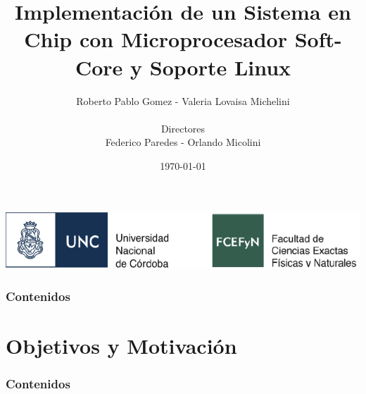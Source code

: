 \documentclass[xcolor=dvipsnames,mathserif,9pt]{beamer}
\author[M. L. Ferster]{Roberto Pablo Gomez - Valeria Lovaisa Michelini \\ \ \\  Directores \\ Federico Paredes - Orlando Micolini}
\title[\hspace{2cm}\insertframenumber/\inserttotalframenumber]{\large
  Implementación de un Sistema en Chip con Microprocesador
Soft-Core y Soporte Linux\\
}
\date{\today} %
\begin{document}
\begin{frame}
  \begin{center}
  \titlepage
  \vspace{0.75cm} 
  \hspace{20mm}
  \includegraphics[height=0.095\textheight]{figuras/logonuevo}
  \scriptsize
  \end{center}
\end{frame}



\begin{frame}
  \frametitle{Contenidos}
  \tableofcontents
\end{frame}

%  
%  
  \section{Objetivos y Motivación}

 
\begin{frame}
   \frametitle{Contenidos}
   \tableofcontents[currentsection]
 \end{frame}
  
\end{document}

